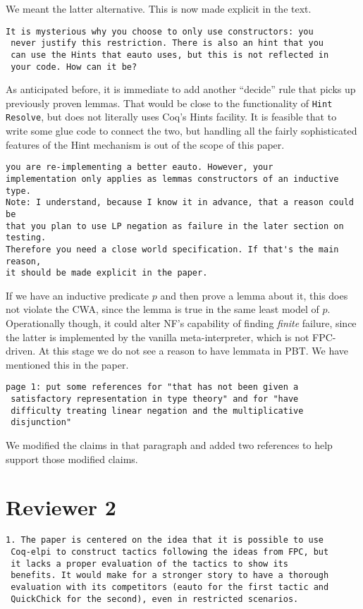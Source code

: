\documentclass{article}
\begin{document}
We meant the latter alternative. This is now made explicit in the text.

\begin{verbatim}
It is mysterious why you choose to only use constructors: you
 never justify this restriction. There is also an hint that you
 can use the Hints that eauto uses, but this is not reflected in
 your code. How can it be?
\end{verbatim}
As anticipated before, it is immediate to add another ``decide'' rule
that picks up previously proven lemmas. That would be close to the
functionality of \texttt{Hint Resolve}, but does not literally uses
Coq's Hints facility. It is feasible that to write some glue
code to connect the two, but handling all the fairly sophisticated features of the Hint
mechanism is out of the scope of this paper.
\begin{verbatim}
you are re-implementing a better eauto. However, your
implementation only applies as lemmas constructors of an inductive type.
Note: I understand, because I know it in advance, that a reason could be
that you plan to use LP negation as failure in the later section on testing.
Therefore you need a close world specification. If that's the main reason,
it should be made explicit in the paper.
\end{verbatim}
If we have an inductive predicate $p$ and then prove a lemma about it,
this does not violate the CWA, since the lemma is true in the same
least model of $p$.  Operationally though, it could alter NF's
capability of finding \emph{finite} failure, since the latter is
implemented by the vanilla meta-interpreter, which is not FPC-driven. At this stage
we do not see a reason to have lemmata in PBT. We have mentioned this in the paper.

\begin{verbatim}
page 1: put some references for "that has not been given a
 satisfactory representation in type theory" and for "have
 difficulty treating linear negation and the multiplicative
 disjunction"
\end{verbatim}

We modified the claims in that paragraph and added two references
to help support those modified claims.

\section*{Reviewer 2}

\begin{verbatim}
1. The paper is centered on the idea that it is possible to use
 Coq-elpi to construct tactics following the ideas from FPC, but
 it lacks a proper evaluation of the tactics to show its
 benefits. It would make for a stronger story to have a thorough
 evaluation with its competitors (eauto for the first tactic and
 QuickChick for the second), even in restricted scenarios.
\end{verbatim}
\end{document}
